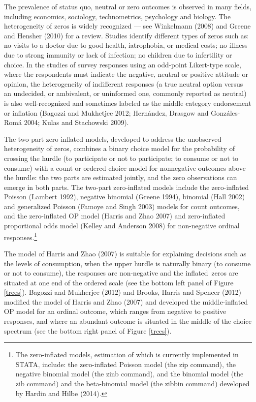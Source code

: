 \documentclass[letterpaper,fleqn,12pt]{article}
\begin{document}
The prevalence of status quo, neutral or zero outcomes is observed in many
fields, including economics, sociology, technometrics, psychology and
biology. The heterogeneity of zeros is widely recognized --- see Winkelmann
(2008) and Greene and Hensher (2010) for a review. Studies identify
different types of zeros such as: no visits to a doctor due to good health,
iatrophobia, or medical costs; no illness due to strong immunity or lack of
infection; no children due to infertility or choice. In the studies of
survey responses using an odd-point Likert-type scale, where the respondents
must indicate the negative, neutral or positive attitude or opinion, the
heterogeneity of indifferent responses (a true neutral option versus an
undecided, or ambivalent, or uninformed one, commonly reported as neutral)
is also well-recognized and sometimes labeled as the middle category
endorsement or inflation (Bagozzi and Mukhetjee 2012; Hern\'{a}ndez, Drasgow
and Gonz\'{a}les-Rom\'{a} 2004; Kulas and Stachowski 2009).

The two-part zero-inflated models, developed to address the unobserved
heterogeneity of zeros, combines a binary choice model for the probability
of crossing the hurdle (to participate or not to participate; to consume or
not to consume) with a count or ordered-choice model for nonnegative
outcomes above the hurdle: the two parts are estimated jointly, and the zero
observations can emerge in both parts. The two-part zero-inflated models
include the zero-inflated Poisson (Lambert 1992), negative binomial (Greene
1994), binomial (Hall 2002) and generalized Poisson (Famoye and Singh 2003)
models for count outcomes, and the zero-inflated OP model (Harris and Zhao
2007) and zero-inflated proportional odds model (Kelley and Anderson 2008)
for non-negative ordinal responses.\footnote{%
The zero-inflated models, estimation of which is currently implemented in
STATA, include: the zero-inflated Poisson model (the zip command), the
negative binomial model (the zinb command), and the binomial model (the zib
command) and the beta-binomial model (the zibbin command) developed by
Hardin and Hilbe (2014).}

The model of Harris and Zhao (2007) is suitable for explaining decisions
such as the levels of consumption, when the upper hurdle is naturally binary
(to consume or not to consume), the responses are non-negative and the
inflated\ zeros are situated at one end of the ordered scale (see the bottom
left panel of Figure \ref{trees}). Bagozzi and Mukherjee (2012) and Brooks,
Harris and Spencer (2012) modified the model of Harris and Zhao (2007) and
developed the middle-inflated OP model for an ordinal outcome, which ranges
from negative to positive responses, and where an abundant outcome is
situated in the middle of the choice spectrum (see the bottom right panel of
Figure \ref{trees}).
\end{document}
